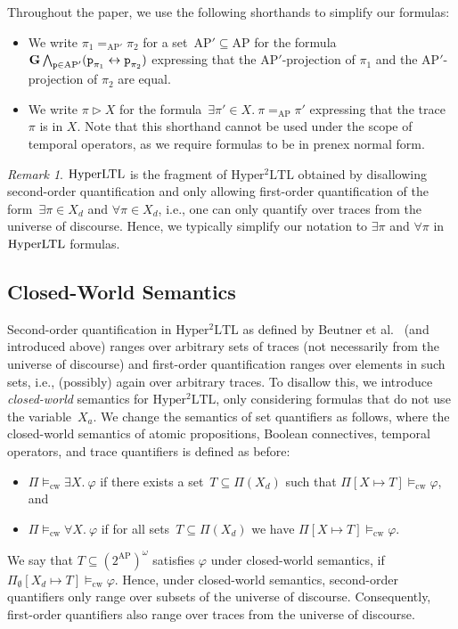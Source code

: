 \documentclass[dvipsnames,10pt,a4paper]{amsart}
\theoremstyle{definition}
\theoremstyle{remark}
\newtheorem{rem}[thm]{Remark}
\renewcommand{\phi}{\varphi}
\newcommand{\pow}[1]{2^{#1}}
\newcommand{\G}{\mathop{\mathbf{G}\vphantom{a}}\nolimits}
\newcommand{\hyltl}{\mathrm{Hyper\-LTL}\xspace}
\newcommand{\sohyltl}{\mathrm{Hyper^2LTL}\xspace}
\newcommand{\ap}[0]{\mathrm{AP}}
\newcommand{\univar}{X_a}
\newcommand{\unidisvar}{X_d}
\newcommand{\proposition}{\texttt{p}}
\newcommand{\tracein}{\mathrel{\triangleright}}
\newcommand{\cw}{\mathrm{cw}}
\newcommand{\equals}[3]{#1 =_{#3} #2}
\begin{document}
Throughout the paper, we use the following shorthands to simplify our formulas:
\begin{itemize}
    
    \item We write $\equals{\pi_1}{\pi_2}{\ap'}$ for a set~$\ap' \subseteq \ap$ for the formula~$ \G\bigwedge_{\proposition\in\ap'}(\proposition_{\pi_1} \leftrightarrow \proposition_{\pi_2})$ expressing that the $\ap'$-projection of $\pi_1$ and the $\ap'$-projection of $\pi_2$ are equal.
    
    \item We write $\pi\tracein X $  for the formula~$\exists \pi' \in X.\ \equals{\pi}{\pi'}{\ap}$ expressing that the trace~$\pi$ is in $X$. Note that this shorthand cannot be used under the scope of temporal operators, as we require formulas to be in prenex normal form.

\end{itemize}


\begin{rem}
\label{rem_hyltlisfragment}
$\hyltl$ is the fragment of $\sohyltl$ obtained by disallowing second-order quantification and only allowing first-order quantification of the form~$\exists \pi \in \unidisvar$ and $\forall \pi \in \unidisvar$, i.e., one can only quantify over traces from the universe of discourse.
Hence, we typically simplify our notation to $\exists\pi$ and $\forall\pi$ in $\hyltl$ formulas.
\end{rem}

\subsection{Closed-World Semantics}
Second-order quantification in $\sohyltl$ as defined by Beutner et al.~\cite{DBLP:conf/cav/BeutnerFFM23} (and introduced above) ranges over arbitrary sets of traces (not necessarily from the universe of discourse) and first-order quantification ranges over elements in such sets, i.e., (possibly) again over arbitrary traces.
To disallow this, we introduce \emph{closed-world} semantics for $\sohyltl$, only considering formulas that do not use the variable~$\univar$. We change the semantics of set quantifiers as follows, 
where the closed-world semantics of atomic propositions, Boolean connectives, temporal operators, and trace quantifiers is defined as before:
\begin{itemize}
    \item $\Pi \models_\cw \exists X.\ \phi$ if there exists a set~$T \subseteq \Pi(\unidisvar)$ such that $\Pi[X\mapsto T] \models_\cw \phi$, and 
    \item $\Pi \models_\cw \forall X.\ \phi$ if for all sets~$T \subseteq \Pi(\unidisvar)$ we have $\Pi[X\mapsto T] \models_\cw \phi$.
\end{itemize}
We say that $T \subseteq (\pow{\ap})^\omega$ satisfies $\phi$ under closed-world semantics, if $\Pi_\emptyset[\unidisvar \mapsto T] \models_\cw \phi$.
Hence, under closed-world semantics, second-order quantifiers only range over subsets of the universe of discourse. 
Consequently, first-order quantifiers also range over traces from the universe of discourse. 
\end{document}
